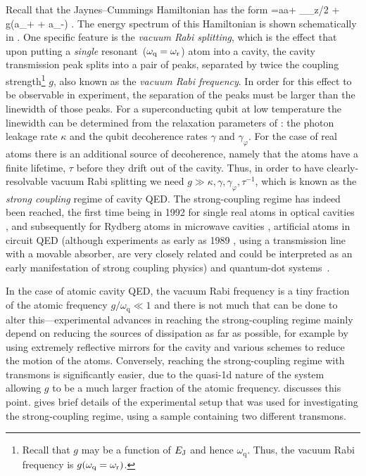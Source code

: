 Recall that the Jaynes--Cummings Hamiltonian has the form
\be
    =\omr a\dg a+ \omega_\sigma_z/2 +  g(a\sigma_+ + a\dg\sigma_-) \tag{\ref{eq:JC}}.
\ee
The energy spectrum of this Hamiltonian is shown schematically in . One specific feature is the \emph{vacuum Rabi splitting}, which is the effect that upon putting a \emph{single} resonant\nopagebreak\ ($\omega_\text{q}=\omega_{\text{r}}$) atom into a cavity, the cavity transmission peak splits into a pair of peaks, separated by twice the coupling strength\footnote{Recall that $g$ may be a function of $E_{\text{J}}$ and hence $\omega_\text{q}$. Thus, the vacuum Rabi frequency is $g(\omega_\text{q}=\omega_{\text{r}})$.} $g$, also known as the \emph{vacuum Rabi frequency}. In order for this effect to be observable in experiment, the separation of the peaks must be larger than the linewidth of those peaks. For a superconducting qubit at low temperature the linewidth can be determined from the relaxation parameters of : the photon leakage rate $\kappa$ and the qubit decoherence rates $\gamma$ and $\gamma_\varphi$. For the case of real atoms there is an additional source of decoherence, namely that the atoms have a finite lifetime, $\tau$ before they drift out of the cavity. Thus, in order to have clearly-resolvable vacuum Rabi splitting we need $g\gg\kappa,\gamma,\gamma_\varphi,\tau^{-1}$, which is known as the \emph{strong coupling} regime of cavity QED\@. The strong-coupling regime has indeed been reached, the first time being in 1992 for single real atoms in optical cavities \cite{thompson_observation_1992}, and subsequently for Rydberg atoms in microwave cavities \cite{raimond_colloquium:_2001}, artificial atoms in circuit QED \cite{wallra_strong_2004} (although experiments as early as 1989 \cite{devoret_effect_1989}, using a transmission line with a movable absorber, are very closely related and could be interpreted as an early manifestation of strong coupling physics) and quantum-dot systems~\cite{reithmaier_strong_2004, yoshie_vacuum_2004}.

In the case of atomic cavity QED, the vacuum Rabi frequency is a tiny fraction of the atomic frequency $g/\omega_\text{q}\ll 1$ and there is not much that can be done to alter this---experimental advances in reaching the strong-coupling regime mainly depend on reducing the sources of dissipation as far as possible, for example by using extremely reflective mirrors for the cavity and various schemes to reduce the motion of the atoms. Conversely, reaching the strong-coupling regime with transmons is significantly easier, due to the quasi-1d nature of the system allowing $g$ to be a much larger fraction of the atomic frequency.  discusses this point.  gives brief details of the experimental setup that was used for investigating the strong-coupling regime, using  a sample containing two different transmons.

